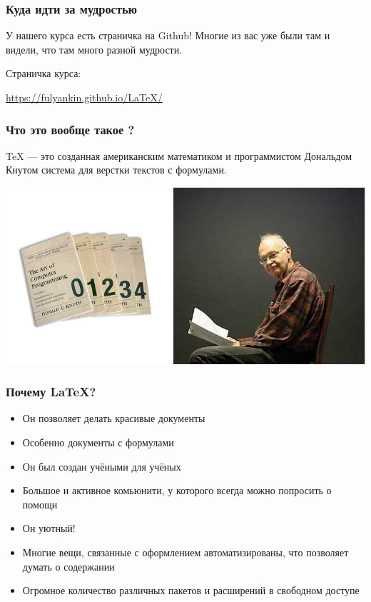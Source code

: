 \documentclass[newPxFont]{beamer}
\begin{document}
\begin{frame}
\frametitle{Куда идти за мудростью}

У нашего курса есть страничка на Github! Многие из вас уже были там и видели, что там много разной мудрости.
\vspace{1cm}

\begin{block}{Страничка курса:}
\vspace{3mm}
\centerline {\url{https://fulyankin.github.io/LaTeX/}} 
\vspace{3mm}
\end{block}
\end{frame}


\begin{frame}
\frametitle{Что это вообще такое ?} 
\alert{TeX} --- это созданная американским математиком и программистом Дональдом Кнутом система для верстки текстов с формулами. 

\centering \includegraphics[scale=0.5]{knut.jpg}\\
\end{frame} 


\begin{frame}
\frametitle{Почему \LaTeX{}?} 
\begin{itemize}
\item Он позволяет делать красивые документы
\item Особенно документы с формулами
\item Он был создан учёными для учёных
\item Большое и активное комьюнити, у которого всегда можно попросить о помощи
\item Он уютный!
\item Многие вещи, связанные с оформлением автоматизированы, что позволяет думать о содержании
\item Огромное количество различных пакетов и расширений в свободном доступе
\end{itemize}
\end{frame}
\end{document}
